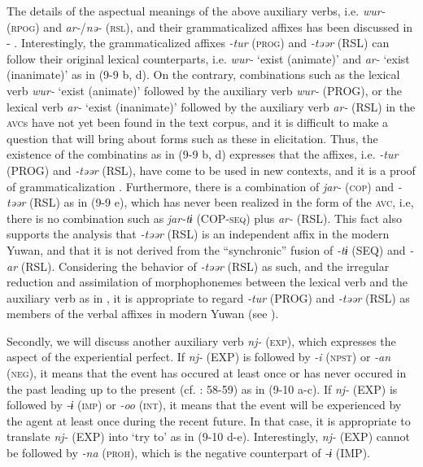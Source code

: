 The details of the aspectual meanings of the above auxiliary verbs, i.e. \textit{wur-} (\textsc{rpog}) and \textit{ar-}/\textit{nə-} (\textsc{rsl}), and their grammaticalized affixes has been discussed in  - . Interestingly, the grammaticalized affixes \textit{{}-tur} (\textsc{prog}) and \textit{{}-təər} (RSL) can follow their original lexical counterparts, i.e. \textit{wur-} ‘exist (animate)’ and \textit{ar-} ‘exist (inanimate)’ as in (9-9 b, d). On the contrary, combinations such as the lexical verb \textit{wur-} ‘exist (animate)’ followed by the auxiliary verb \textit{wur-} (PROG), or the lexical verb \textit{ar-} ‘exist (inanimate)’ followed by the auxiliary verb \textit{ar-} (RSL) in the \textsc{avc}s have not yet been found in the text corpus, and it is difficult to make a question that will bring about forms such as these in elicitation. Thus, the existence of the combinatins as in (9-9 b, d) expresses that the affixes, i.e. \textit{{}-tur} (PROG) and \textit{{}-təər} (RSL), have come to be used in new contexts, and it is a proof of grammaticalization \parencite[cf.][2]{HeineKuteva2002}. Furthermore, there is a combination of \textit{jar-} (\textsc{cop}) and \textit{{}-təər} (RSL) as in (9-9 e), which has never been realized in the form of the \textsc{avc}, i.e, there is no combination such as \textit{jar-tɨ} (COP-\textsc{seq}) plus \textit{ar-} (RSL). This fact also supports the analysis that \textit{{}-təər} (RSL) is an independent affix in the modern Yuwan, and that it is not derived from the “synchronic” fusion of \textit{{}-tɨ} (SEQ) and \textit{{}-ar} (RSL). Considering the behavior of \textit{{}-təər} (RSL) as such, and the irregular reduction and assimilation of morphophonemes between the lexical verb and the auxiliary verb as in , it is appropriate to regard \textit{{}-tur} (PROG) and \textit{{}-təər} (RSL) as members of the verbal affixes in modern Yuwan (see ).

Secondly, we will discuss another auxiliary verb \textit{nj-} (\textsc{exp}), which expresses the aspect of the experiential perfect. If \textit{nj-} (EXP) is followed by \textit{{}-i} (\textsc{npst}) or \textit{{}-an} (\textsc{neg}), it means that the event has occured at least once or has never occured in the past leading up to the present (cf. \citealt{Comrie1976}: 58-59) as in (9-10 a-c). If \textit{nj-} (EXP) is followed by \textit{{}-ɨ} (\textsc{imp}) or \textit{{}-oo} (\textsc{int}), it means that the event will be experienced by the agent at least once during the recent future. In that case, it is appropriate to translate \textit{nj-} (EXP) into ‘try to’ as in (9-10 d-e). Interestingly, \textit{nj-} (EXP) cannot be followed by \textit{{}-na} (\textsc{proh}), which is the negative counterpart of \textit{{}-ɨ} (IMP).

